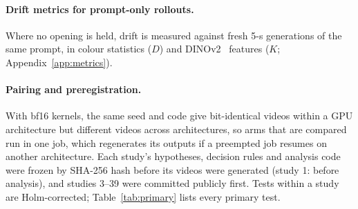 \documentclass[10pt]{article}
\begin{document}
\paragraph{Drift metrics for prompt-only rollouts.} Where no opening is held, drift is measured against fresh 5-s
generations of the same prompt, in colour statistics ($D$) and DINOv2~\cite{dinov2} features ($K$; Appendix~\ref{app:metrics}).

\paragraph{Pairing and preregistration.} With bf16 kernels, the same seed and code give bit-identical videos within a
GPU architecture but different videos across architectures, so arms that are compared run in one job, which
regenerates its outputs if a preempted job resumes on another architecture. Each study's hypotheses, decision rules
and analysis code were frozen by SHA-256 hash before its videos were generated (study 1: before analysis), and studies
3--39 were committed publicly first. Tests within a study are Holm-corrected; Table~\ref{tab:primary} lists
every primary test.








\appendix

\end{document}
